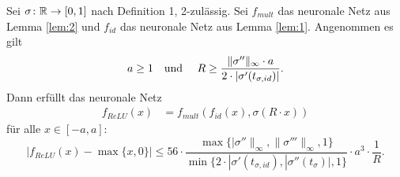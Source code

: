   \begin{lem}
  \label{lem:3}
  Sei $\sigma\colon \mathbb{R} \to [0, 1]$ nach Definition 1, 2-zulässig. Sei $f_{mult}$ das neuronale Netz aus Lemma \ref{lem:2} und $f_{id}$ das neuronale Netz aus Lemma \ref{lem:1}. Angenommen es gilt $$a \geq 1 \text{\quad und \quad} R \geq \frac{\|\sigma''\|_{\infty} \cdot a}{2 \cdot |\sigma'(t_{\sigma, id})|}.$$ 
  Dann erfüllt das neuronale Netz 
  \begin{equation*}
  \begin{split}
  f_{ReLU}(x) & = f_{mult}(f_{id}(x), \sigma(R \cdot x)) 
  \end{split}
  \end{equation*}
 für alle $x \in [-a, a]\colon$
 $$|f_{ReLU}(x) - \max\{x, 0\}| \leq 56 \cdot \frac{\max\{|\sigma''\|_{\infty}, \|\sigma'''\|_{\infty}, 1\}}{\min\{2 \cdot |\sigma'(t_{\sigma, id}), |\sigma''(t_{\sigma})|, 1\}} \cdot a^3 \cdot \frac{1}{R}.$$
  \end{lem}
